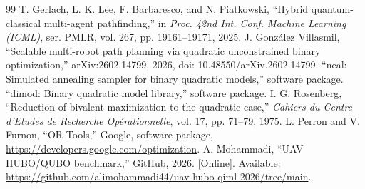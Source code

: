 \documentclass[10pt,conference]{IEEEtran}
\begin{document}
\begin{thebibliography}{99}
 T. Gerlach, L. K. Lee, F. Barbaresco, and N. Piatkowski, ``Hybrid quantum-classical multi-agent pathfinding,'' in \emph{Proc. 42nd Int. Conf. Machine Learning (ICML)}, ser. PMLR, vol. 267, pp. 19161--19171, 2025.
 J. Gonz\'alez Villasmil, ``Scalable multi-robot path planning via quadratic unconstrained binary optimization,'' arXiv:2602.14799, 2026, doi: 10.48550/arXiv.2602.14799.
 ``neal: Simulated annealing sampler for binary quadratic models,'' software package.
 ``dimod: Binary quadratic model library,'' software package.
 I. G. Rosenberg, ``Reduction of bivalent maximization to the quadratic case,'' \emph{Cahiers du Centre d'Etudes de Recherche Op\'erationnelle}, vol. 17, pp. 71--79, 1975.
 L. Perron and V. Furnon, ``OR-Tools,'' Google, software package, \url{https://developers.google.com/optimization}.
 A. Mohammadi, ``UAV HUBO/QUBO benchmark,'' GitHub, 2026. [Online]. Available: \url{https://github.com/alimohammadi44/uav-hubo-qiml-2026/tree/main}.
\end{thebibliography}
\end{document}
